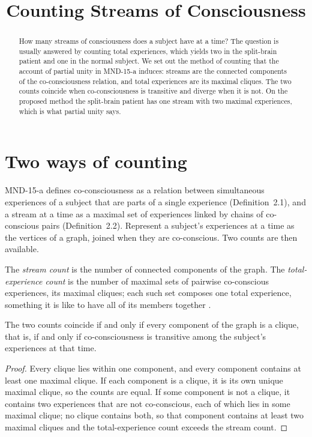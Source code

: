 \documentclass{situationist-preprint}
\title{Counting Streams of Consciousness}
\begin{document}
\maketitle

\begin{abstract}
How many streams of consciousness does a subject have at a time? The question is usually answered by counting total experiences, which yields two in the split-brain patient and one in the normal subject. We set out the method of counting that the account of partial unity in MND-15-a induces: streams are the connected components of the co-consciousness relation, and total experiences are its maximal cliques. The two counts coincide when co-consciousness is transitive and diverge when it is not. On the proposed method the split-brain patient has one stream with two maximal experiences, which is what partial unity says.
\end{abstract}

\section{Two ways of counting}

MND-15-a defines co-consciousness as a relation between simultaneous experiences of a subject that are parts of a single experience (Definition~2.1), and a stream at a time as a maximal set of experiences linked by chains of co-conscious pairs (Definition~2.2). Represent a subject's experiences at a time as the vertices of a graph, joined when they are co-conscious. Two counts are then available.

\begin{definition}\label{d:counts}
The \emph{stream count} is the number of connected components of the graph. The \emph{total-experience count} is the number of maximal sets of pairwise co-conscious experiences, its maximal cliques; each such set composes one total experience, something it is like to have all of its members together \citep{BayneChalmers2003}.
\end{definition}

\begin{proposition}\label{p:coincide}
The two counts coincide if and only if every component of the graph is a clique, that is, if and only if co-consciousness is transitive among the subject's experiences at that time.
\end{proposition}

\begin{proof}
Every clique lies within one component, and every component contains at least one maximal clique. If each component is a clique, it is its own unique maximal clique, so the counts are equal. If some component is not a clique, it contains two experiences that are not co-conscious, each of which lies in some maximal clique; no clique contains both, so that component contains at least two maximal cliques and the total-experience count exceeds the stream count.
\end{proof}
\end{document}
